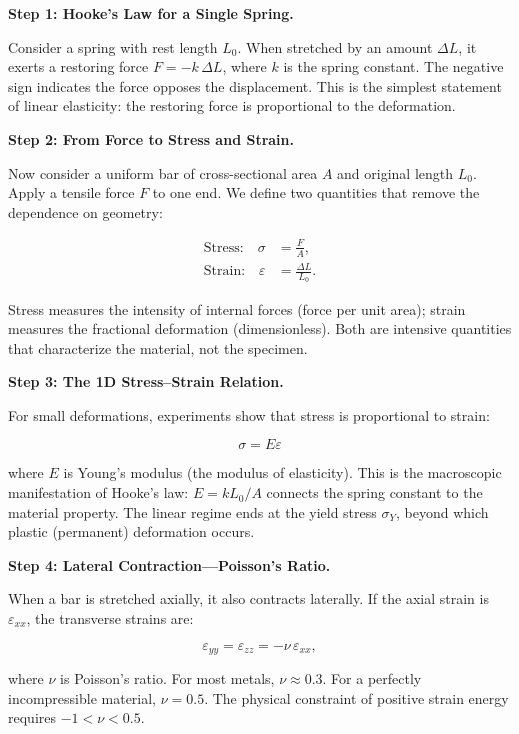 \textbf{Step 1: Hooke's Law for a Single Spring.}

Consider a spring with rest length $L_0$. When stretched by an amount $\Delta L$, it exerts a restoring force $F = -k\,\Delta L$, where $k$ is the spring constant. The negative sign indicates the force opposes the displacement. This is the simplest statement of linear elasticity: the restoring force is proportional to the deformation.

\textbf{Step 2: From Force to Stress and Strain.}

Now consider a uniform bar of cross-sectional area $A$ and original length $L_0$. Apply a tensile force $F$ to one end. We define two quantities that remove the dependence on geometry:

\begin{align}
\text{Stress:} \quad \sigma &= \frac{F}{A}, \\
\text{Strain:} \quad \varepsilon &= \frac{\Delta L}{L_0}.
\end{align}

Stress measures the intensity of internal forces (force per unit area); strain measures the fractional deformation (dimensionless). Both are intensive quantities that characterize the material, not the specimen.

\textbf{Step 3: The 1D Stress--Strain Relation.}

For small deformations, experiments show that stress is proportional to strain:

\begin{equation}
\boxed{\sigma = E\varepsilon}
\end{equation}

where $E$ is Young's modulus (the modulus of elasticity). This is the macroscopic manifestation of Hooke's law: $E = kL_0/A$ connects the spring constant to the material property. The linear regime ends at the yield stress $\sigma_Y$, beyond which plastic (permanent) deformation occurs.

\textbf{Step 4: Lateral Contraction---Poisson's Ratio.}

When a bar is stretched axially, it also contracts laterally. If the axial strain is $\varepsilon_{xx}$, the transverse strains are:

\begin{equation}
\varepsilon_{yy} = \varepsilon_{zz} = -\nu\,\varepsilon_{xx},
\end{equation}

where $\nu$ is Poisson's ratio. For most metals, $\nu \approx 0.3$. For a perfectly incompressible material, $\nu = 0.5$. The physical constraint of positive strain energy requires $-1 < \nu < 0.5$.

